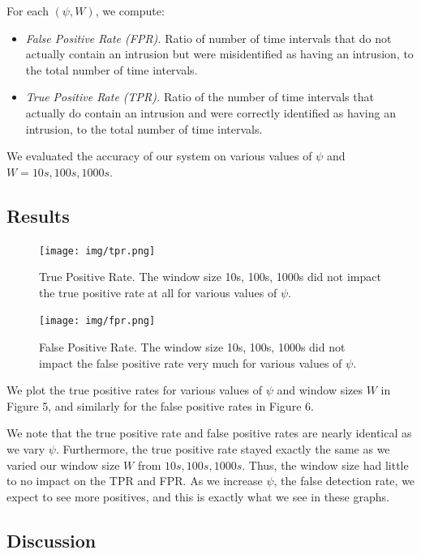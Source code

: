 \documentclass[10pt,twocolumn]{article}
\begin{document}
For each $(\psi, W)$, we compute:
\begin{itemize}
\item {\em False Positive Rate (FPR).} Ratio of number of time intervals that do not actually contain an intrusion
but were misidentified as having an intrusion, to the total number of time intervals.
\item {\em True Positive Rate (TPR).} Ratio of the number of time intervals that actually do contain an intrusion
and were correctly identified as having an intrusion, to the total number of time intervals.
\end{itemize}

We evaluated the accuracy of our system on various values of $\psi$ and $W = 10s, 100s, 1000s$.

\subsection{Results}

\noindent
\begin{figure}
  \label{tpr}
  \centering
    \texttt{[image: img/tpr.png]}
    \caption{True Positive Rate. The window size 10s, 100s, 1000s did not impact the true positive rate at all for various values of $\psi$.} 
\end{figure}

\noindent
\begin{figure}
  \label{fpr}
  \centering
    \texttt{[image: img/fpr.png]}
    \caption{False Positive Rate. The window size 10s, 100s, 1000s did not impact the false positive rate very
    much for various values of $\psi$.} 
\end{figure}

We plot the true positive rates for various values of $\psi$ and window sizes $W$ in Figure 5, and similarly for the false positive rates in Figure 6.

We note that the true positive rate and false positive rates are nearly identical as we vary $\psi$. Furthermore, the true positive rate stayed exactly the same as we varied our window size $W$ from $10s, 100s, 1000s$. Thus, the window size had little to no impact on the TPR and FPR. As we increase $\psi$, the false detection rate, we expect to see more positives, and this is exactly what we see in these graphs.

\subsection{Discussion}
\end{document}
